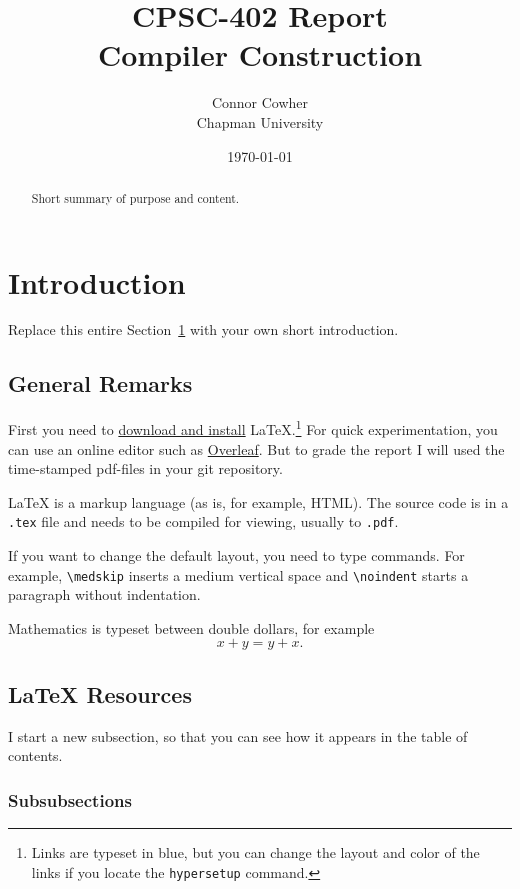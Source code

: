 \documentclass{article}
\title{CPSC-402 Report\\Compiler Construction}
\author{Connor Cowher  \\ Chapman University}
\date{\today}
\theoremstyle{theorem}
\theoremstyle{definition}
\theoremstyle{remark}
\begin{document}
\maketitle

\begin{abstract}
Short  summary of purpose and content.  
\end{abstract}

\tableofcontents

\section{Introduction}\label{intro}

Replace this entire Section~\ref{intro} with your own short introduction. 

\subsection{General Remarks}

First you need to \href{https://www.latex-project.org/get/}{download and install} LaTeX.\footnote{Links are typeset in blue, but you can change the layout and color of the links if you locate the  \texttt{hypersetup} command.}
%
For quick experimentation, you can use an online editor such as \href{https://www.overleaf.com/learn}{Overleaf}. But to grade the report I will used the time-stamped pdf-files in your git repository.  

 
\medskip\noindent
LaTeX is a markup language (as is, for example, HTML). The source code is in a \verb+.tex+ file and needs to be compiled for viewing, usually to \verb+.pdf+.


\medskip\noindent
If you want to change the default layout, you need to type commands. For example, \verb+\medskip+ inserts a medium vertical space and \verb+\noindent+ starts a paragraph without indentation.
 
\medskip\noindent
Mathematics is typeset between double dollars, for example $$x+y=y+x.$$


\subsection{LaTeX Resources}

I start a new subsection, so that you can see how it appears in the table of contents.

\subsubsection{Subsubsections}
\end{document}
